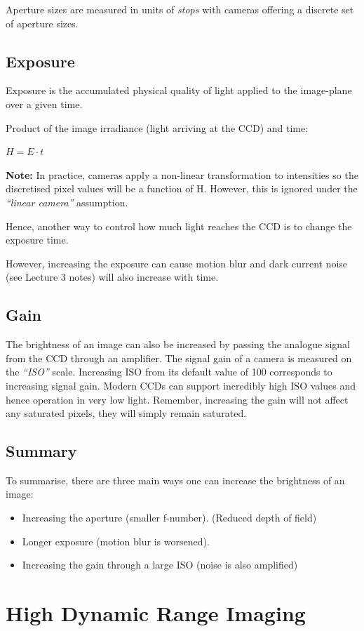 \documentclass{article}
\begin{document}
Aperture sizes are measured in units of {\it stops} with cameras offering a discrete set of aperture sizes.

\subsection{Exposure}
Exposure is the accumulated physical quality of light applied to the image-plane over a given time.

Product of the image irradiance (light arriving at the CCD) and time: 
\centerline{$H = E\cdot t$}

{\bf Note:} In practice, cameras apply a non-linear transformation to intensities so the discretised pixel values will be a function of H. However, this is ignored under the {\it ``linear camera''} assumption.

Hence, another way to control how much light reaches the CCD is to change the exposure time.

However, increasing the exposure can cause motion blur and dark current noise (see Lecture 3 notes) will also increase with time.

\subsection{Gain}
The brightness of an image can also be increased by passing the analogue signal from the CCD through an amplifier.
The signal gain of a camera is measured on the {\it ``ISO''} scale.
Increasing ISO from its default value of 100 corresponds to increasing signal gain.
Modern CCDs can support incredibly high ISO values and hence operation in very low light.
Remember, increasing the gain will not affect any saturated pixels, they will simply remain saturated.

\subsection{Summary}
To summarise, there are three main ways one can increase the brightness of an image:

\begin{itemize}
	\item Increasing the aperture (smaller f-number). (Reduced depth of field)
	\item Longer exposure (motion blur is worsened).
	\item Increasing the gain through a large ISO (noise is also amplified)
\end{itemize}
\section{High Dynamic Range Imaging}
\end{document}
